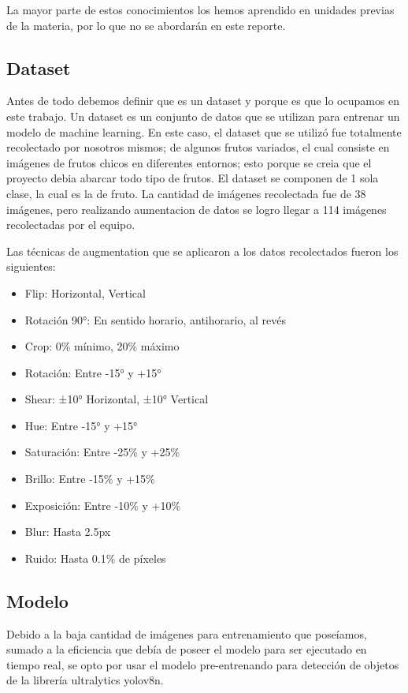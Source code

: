\documentclass[conference]{IEEEtran}
\begin{document}
La mayor parte de estos conocimientos los hemos aprendido en unidades previas de la materia, por lo que no se abordarán en este reporte.

\subsection{Dataset}
Antes de todo debemos definir que es un dataset y porque es que lo ocupamos en este trabajo.
Un dataset es un conjunto de datos que se utilizan para entrenar un modelo de machine learning. En este caso, el dataset que se utilizó fue totalmente recolectado por nosotros mismos; de algunos frutos variados,\cite{} el cual consiste en imágenes de frutos chicos en diferentes entornos; esto porque se creia que el proyecto debia abarcar todo tipo de frutos. El dataset se componen de 1 sola clase, la cual es la de fruto. La cantidad de imágenes recolectada fue de 38 imágenes, pero realizando aumentacion de datos se logro llegar a 114 imágenes recolectadas por el equipo.

Las técnicas de augmentation que se aplicaron a los datos recolectados fueron los siguientes:
\begin{itemize}
    \item Flip: Horizontal, Vertical
    \item Rotación 90°: En sentido horario, antihorario, al revés
    \item Crop: 0\% mínimo, 20\% máximo
    \item Rotación: Entre -15° y +15°
    \item Shear: ±10° Horizontal, ±10° Vertical
    \item Hue: Entre -15° y +15°
    \item Saturación: Entre -25\% y +25\%
    \item Brillo: Entre -15\% y +15\%
    \item Exposición: Entre -10\% y +10\%
    \item Blur: Hasta 2.5px
    \item Ruido: Hasta 0.1\% de píxeles
\end{itemize}

\subsection{Modelo}
Debido a la baja cantidad de imágenes para entrenamiento que poseíamos, sumado a la eficiencia que debía de poseer el modelo para ser ejecutado en tiempo real, se opto por usar el modelo pre-entrenando para detección de objetos de la librería ultralytics\cite{} yolov8n\cite{}.
\end{document}
